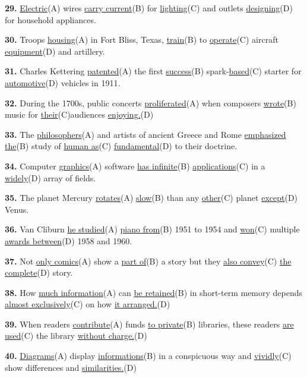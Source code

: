 \documentclass[12pt]{article}
\begin{document}
\par
\vspace{\questionblockgap}
\noindent\textbf{29.} \uline{Electric}(A) wires \uline{carry current}(B) for \uline{lighting}(C) and outlets \uline{designing}(D) for household appliances.
\par
\vspace{\questionblockgap}
\noindent\textbf{30.} Troops \uline{housing}(A) in Fort Bliss, Texas, \uline{train}(B) to \uline{operate}(C) aircraft \uline{equipment}(D) and artillery.
\par
\vspace{\questionblockgap}
\noindent\textbf{31.} Charles Kettering \uline{patented}(A) the first \uline{success}(B) spark-\uline{based}(C) starter for \uline{automotive}(D) vehicles in 1911.
\par
\vspace{\questionblockgap}
\noindent\textbf{32.} During the 1700s, public concerts \uline{proliferated}(A) when composers \uline{wrote}(B) music for \uline{their}(C)audiences \uline{enjoying.}(D)
\par
\vspace{\questionblockgap}
\noindent\textbf{33.} The \uline{philosophers}(A) and artists of ancient Greece and Rome \uline{emphasized the}(B) study of \uline{human as}(C) \uline{fundamental}(D) to their doctrine.
\par
\vspace{\questionblockgap}
\noindent\textbf{34.} Computer \uline{graphics}(A) software \uline{has infinite}(B) \uline{applications}(C) in a \uline{widely}(D) array of fields.
\par
\vspace{\questionblockgap}
\noindent\textbf{35.} The planet Mercury \uline{rotates}(A) \uline{slow}(B) than any \uline{other}(C) planet \uline{except}(D) Venus.
\par
\vspace{\questionblockgap}
\noindent\textbf{36.} Van Cliburn \uline{he studied}(A) \uline{piano from}(B) 1951 to 1954 and \uline{won}(C) multiple \uline{awards between}(D) 1958 and 1960.
\par
\vspace{\questionblockgap}
\noindent\textbf{37.} Not \uline{only comics}(A) show a \uline{part of}(B) a story but they \uline{also convey}(C) \uline{the complete}(D) story.
\par
\vspace{\questionblockgap}
\noindent\textbf{38.} How \uline{much information}(A) can \uline{be retained}(B) in short-term memory depends \uline{almost exclusively}(C) on how \uline{it arranged.}(D)
\par
\vspace{\questionblockgap}
\noindent\textbf{39.} When readers \uline{contribute}(A) funds \uline{to private}(B) libraries, these readers \uline{are used}(C) the library \uline{without charge.}(D)
\par
\vspace{\questionblockgap}
\noindent\textbf{40.} \uline{Diagrams}(A) display \uline{informations}(B) in a conspicuous way and \uline{vividly}(C) show differences and \uline{similarities.}(D)
\par
\vspace{\questionblockgap}
\end{document}
